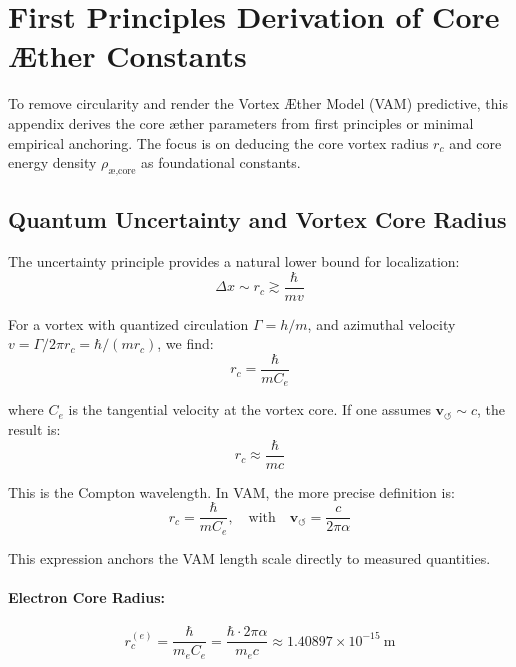 \section{First Principles Derivation of Core \AE{}ther Constants}

        To remove circularity and render the Vortex \AE{}ther Model (VAM) predictive, this appendix derives the core \ae{}ther parameters from first principles or minimal empirical anchoring. The focus is on deducing the core vortex radius $r_c$ and core energy density $\rho_{\text{\ae,core}}$ as foundational constants.

        \subsection{ Quantum Uncertainty and Vortex Core Radius}

        The uncertainty principle provides a natural lower bound for localization:
        \begin{equation}
        \Delta x \sim r_c \gtrsim \frac{\hbar}{m v}
        \end{equation}

        For a vortex with quantized circulation $\Gamma = h/m$, and azimuthal velocity $v = \Gamma / 2\pi r_c = \hbar / (m r_c)$, we find:
        \begin{equation}
        r_c = \frac{\hbar}{m C_e}
        \end{equation}

        where $C_e$ is the tangential velocity at the vortex core. If one assumes $\mathbf{v}_{\scriptscriptstyle\boldsymbol{\circlearrowleft}} \sim c$, the result is:
        \begin{equation}
        r_c \approx \frac{\hbar}{m c}
        \end{equation}

        This is the Compton wavelength. In VAM, the more precise definition is:
        \begin{equation}
        r_c = \frac{\hbar}{m C_e}, \quad \text{with} \quad \mathbf{v}_{\scriptscriptstyle\boldsymbol{\circlearrowleft}} = \frac{c}{2\pi \alpha}
        \end{equation}

        This expression anchors the VAM length scale directly to measured quantities.

        \paragraph{Electron Core Radius:}
        \begin{equation}
        r_c^{(e)} = \frac{\hbar}{m_e C_e} = \frac{\hbar \cdot 2\pi \alpha}{m_e c} \approx 1.40897 \times 10^{-15} \ \text{m}
        \end{equation}


